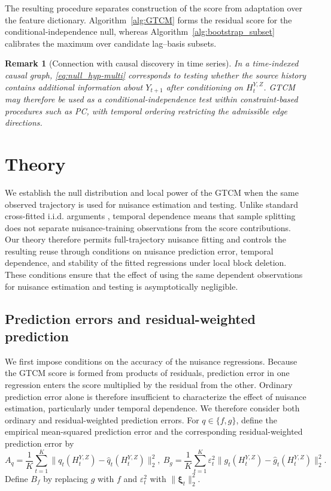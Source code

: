 \documentclass[12pt]{article}
\newtheorem{remark}[theorem]{Remark}
\numberwithin{equation}{section}
\begin{document}
The resulting procedure separates construction of the score from adaptation over the feature dictionary. Algorithm~\ref{alg:GTCM} forms the residual score for the conditional-independence null, whereas Algorithm~\ref{alg:bootstrap_subset} calibrates the maximum over candidate lag--basis subsets.

\begin{remark}[Connection with causal discovery in time series]
In a time-indexed causal graph, \eqref{eq:null_hyp-multi} corresponds to testing whether the source history contains additional information about \(Y_{t+1}\) after conditioning on \(H_t^{Y,Z}\). GTCM may therefore be used as a conditional-independence test within constraint-based procedures such as PC, with temporal ordering restricting the admissible edge directions. 
\end{remark}

\section{Theory}
\label{sec:theory}

We establish the null distribution and local power of the GTCM when the same observed trajectory is used for nuisance estimation and testing. Unlike standard cross-fitted i.i.d. arguments \citep{chernozhukov2018double}, temporal dependence means that sample splitting does not separate nuisance-training observations from the score contributions. Our theory therefore permits full-trajectory nuisance fitting and controls the resulting reuse through conditions on nuisance prediction error, temporal dependence, and stability of the fitted regressions under local block deletion. These conditions ensure that the effect of using the same dependent observations for nuisance estimation and testing is asymptotically negligible.

\subsection{Prediction errors and residual-weighted prediction}

We first impose conditions on the accuracy of the nuisance regressions. Because the GTCM score is formed from products of residuals, prediction error in one regression enters the score multiplied by the residual from the other. Ordinary prediction error alone is therefore insufficient to characterize the effect of nuisance estimation, particularly under temporal dependence. We therefore consider both ordinary and residual-weighted prediction errors. For \(q\in\{f,g\}\), define the empirical mean-squared prediction error and the corresponding residual-weighted prediction error by
\begin{equation*}
    A_q=\frac1K\sum_{t=1}^K
\big\|q_t(H_t^{Y,Z})-\hat q_t(H_t^{Y,Z})\big\|_2^2, ~B_g
=\frac1K\sum_{t=1}^K\varepsilon_t^2
\big\|g_t(H_t^{Y,Z})-\hat g_t(H_t^{Y,Z})\big\|_2^2.
\end{equation*}
Define \(B_f\) by replacing \(g\) with \(f\) and
\(\varepsilon_t^2\) with \(\|\boldsymbol\xi_t\|_2^2\).
\end{document}
